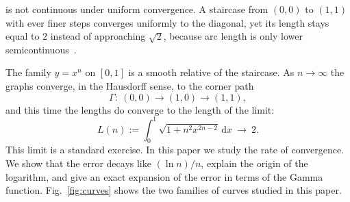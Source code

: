 \documentclass[journal]{IEEEtran}
\newcommand{\dd}{\,\mathrm{d}}
\begin{document}
 is not continuous under uniform convergence. A staircase from
$(0,0)$ to $(1,1)$ with ever finer steps converges uniformly to the diagonal, yet its length
stays equal to $2$ instead of approaching $\sqrt2$, because arc length is only lower
semicontinuous~\cite{BBI}.

The family $y=x^n$ on $[0,1]$ is a smooth relative of the staircase. As $n\to\infty$ the
graphs converge, in the Hausdorff sense, to the corner path
\[
  \Gamma:\ (0,0)\longrightarrow(1,0)\longrightarrow(1,1),
\]
and this time the lengths do converge to the length of the limit:
\begin{equation}\label{eq:Ldef}
  L(n):=\int_0^1\sqrt{1+n^2x^{2n-2}}\dd x\ \longrightarrow\ 2.
\end{equation}
This limit is a standard exercise. In this paper we study the rate of convergence. We show that
the error decays like $(\ln n)/n$, explain the origin of the logarithm, and give an exact
expansion of the error in terms of the Gamma function.
Fig.~\ref{fig:curves} shows the two families of curves studied in this paper.
\end{document}

